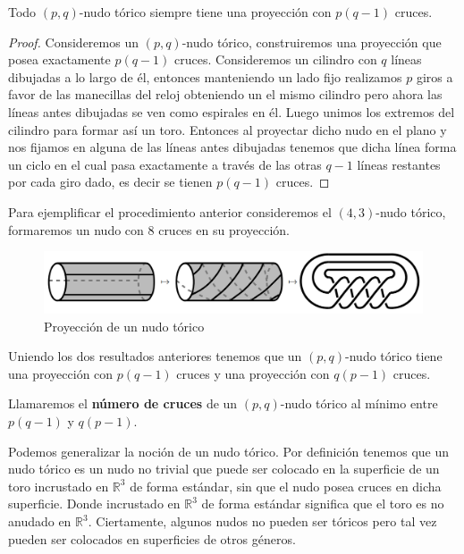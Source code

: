 \begin{prp}\label{prp:t1}
	Todo $(p,q)$-nudo tórico siempre tiene una proyección con $p(q-1)$ cruces.
\end{prp}

\begin{proof}
	Consideremos un $(p,q)$-nudo tórico, construiremos una proyección que posea exactamente $p(q-1)$ cruces. Consideremos un cilindro con $q$ líneas dibujadas a lo largo de él, entonces manteniendo un lado fijo realizamos $p$ giros a favor de las manecillas del reloj obteniendo un el mismo cilindro pero ahora las líneas antes dibujadas se ven como espirales en él. Luego unimos los extremos del cilindro para formar así un toro. Entonces al proyectar dicho nudo en el plano y nos fijamos en alguna de las líneas antes dibujadas tenemos que dicha línea forma un ciclo en el cual pasa exactamente a través de las otras $q-1$ líneas restantes por cada giro dado, es decir se tienen $p(q-1)$ cruces. 
\end{proof}

Para ejemplificar el procedimiento anterior consideremos el $(4,3)$-nudo tórico, formaremos un nudo con $8$ cruces en su proyección.

\begin{figure}[ht]
	\centering
	\includegraphics[width=0.8\linewidth]{t7}
	\caption[Proyección de un nudo tórico]{Proyección de un nudo tórico}
	\label{fig:t7}
\end{figure}

Uniendo los dos resultados anteriores tenemos que un $(p,q)$-nudo tórico tiene una proyección con $p(q-1)$ cruces y una proyección con $q(p-1)$ cruces.

\begin{defn}\label{dfcp43} Llamaremos el \textbf{número de cruces} de un $(p,q)$-nudo tórico al mínimo entre $p(q-1)$ y $q(p-1)$.
\end{defn}

Podemos generalizar la noción de un nudo tórico. Por definición tenemos que un nudo tórico es un nudo no trivial que puede ser colocado en la superficie de un toro incrustado en $\mathbb{R}^3$ de forma estándar, sin que el nudo posea cruces en dicha superficie. Donde incrustado en $\mathbb{R}^3$ de forma estándar significa que el toro es no anudado en $\mathbb{R}^3$. Ciertamente, algunos nudos no pueden ser tóricos pero tal vez pueden ser colocados en superficies de otros géneros.

